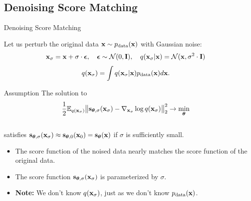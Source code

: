 \documentclass{beamer}
\begin{document}
\subsection{Denoising Score Matching}
\begin{frame}{Denoising Score Matching}

	Let us perturb the original data $\mathbf{x} \sim p_{\text{data}}(\mathbf{x})$ with Gaussian noise:
	\vspace{-0.3cm}
	\[
		\mathbf{x}_{\sigma} = \mathbf{x} + \sigma \cdot \boldsymbol{\epsilon}, \quad \boldsymbol{\epsilon} \sim \mathcal{N}(0, \mathbf{I}), \quad q(\mathbf{x}_{\sigma} | \mathbf{x}) = \mathcal{N}(\mathbf{x}, \sigma^2 \cdot \mathbf{I})
	\]
	\eqpause
	\vspace{-0.4cm}
	\[
		q(\mathbf{x}_{\sigma}) = \int q(\mathbf{x}_{\sigma} | \mathbf{x}) p_{\text{data}}(\mathbf{x}) d\mathbf{x}.
	\]
	\eqpause
	\vspace{-0.5cm}
	\begin{block}{Assumption}
		The solution to
		\[
			\frac{1}{2} \mathbb{E}_{q(\mathbf{x}_{\sigma})}\big\| \mathbf{s}_{\boldsymbol{\theta}, \sigma}(\mathbf{x}_{\sigma}) - \nabla_{\mathbf{x}_{\sigma}} \log q(\mathbf{x}_{\sigma}) \big\|^2_2 \rightarrow \min_{\boldsymbol{\theta}}
		\]
		\vspace{-0.3cm} \\
		satisfies $\mathbf{s}_{\boldsymbol{\theta}, \sigma}(\mathbf{x}_{\sigma}) \approx \mathbf{s}_{\boldsymbol{\theta}, 0}(\mathbf{x}_0) = \mathbf{s}_{\boldsymbol{\theta}}(\mathbf{x})$ if $\sigma$ is sufficiently small.
	\end{block}
	\eqpause
	\begin{itemize}
		\item The score function of the noised data nearly matches the score function of the original data.
		\item The score function $\mathbf{s}_{\boldsymbol{\theta}, \sigma}(\mathbf{x}_{\sigma})$ is parameterized by $\sigma$.
		\item \textbf{Note:} We don't know $q(\mathbf{x}_{\sigma})$, just as we don't know $p_{\text{data}}(\mathbf{x})$.
	\end{itemize}
\end{frame}
\end{document}
